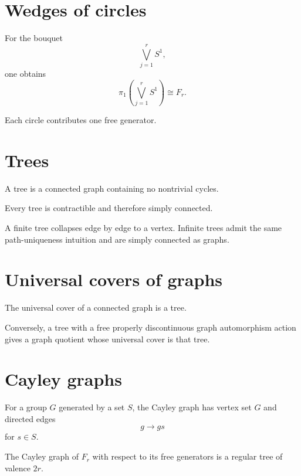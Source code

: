 \section{Wedges of circles}

For the bouquet
\[
\bigvee_{j=1}^rS^1,
\]
one obtains
\[
\pi_1\left(\bigvee_{j=1}^rS^1\right)\cong F_r.
\]

Each circle contributes one free generator.

\section{Trees}

\begin{definition}[Tree]
\label{def:viii14-tree}
A tree is a connected graph containing no nontrivial cycles.
\end{definition}

\begin{theorem}
\label{thm:viii14-tree-simply}
Every tree is contractible and therefore simply connected.
\end{theorem}

A finite tree collapses edge by edge to a vertex.  Infinite trees admit the
same path-uniqueness intuition and are simply connected as graphs.

\section{Universal covers of graphs}

\begin{theorem}
\label{thm:viii14-universal-tree}
The universal cover of a connected graph is a tree.
\end{theorem}

Conversely, a tree with a free properly discontinuous graph automorphism action
gives a graph quotient whose universal cover is that tree.

\section{Cayley graphs}

For a group \(G\) generated by a set \(S\), the Cayley graph has vertex set
\(G\) and directed edges
\[
g\longrightarrow gs
\]
for \(s\in S\).

\begin{example}
\label{ex:viii14-cayley-tree}
The Cayley graph of \(F_r\) with respect to its free generators is a regular
tree of valence \(2r\).
\end{example}

